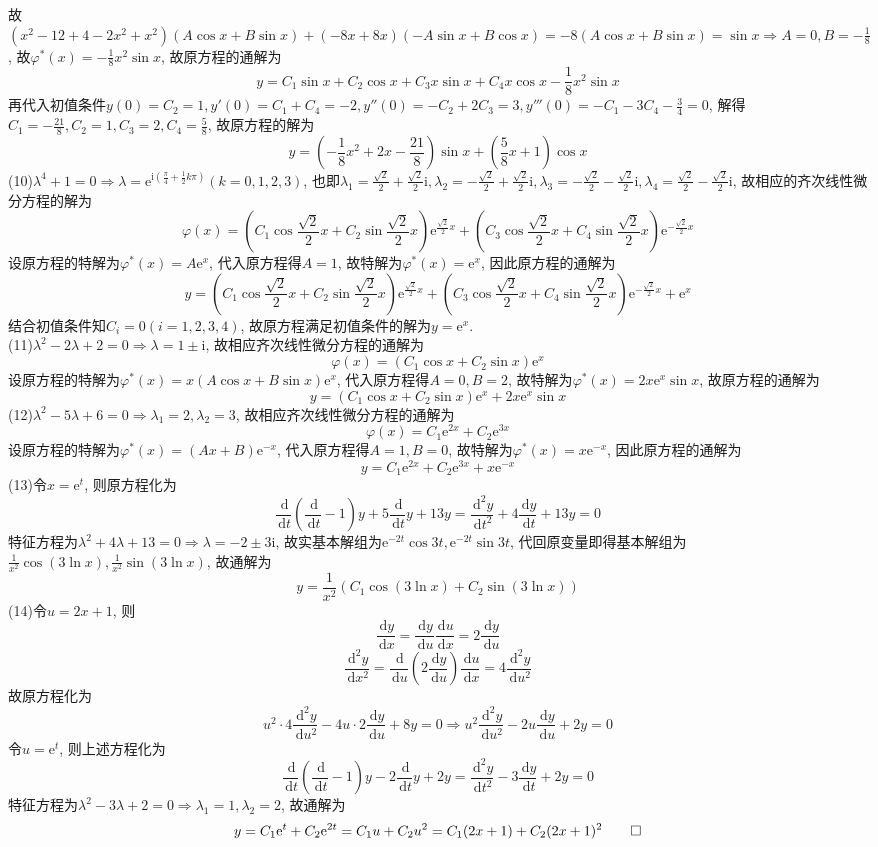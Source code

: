 \documentclass[titlepage,11pt,a4paper,twoside]{report}
\makeatletter
\newcommand\diff{\,\mathrm{d}}
\newcommand\e{\mathrm{e}}
\newcommand\ii{\mathrm{i}}
\newenvironment{solve}{\par
	\pushQED{\qed}%
	\normalfont \topsep1\p@\@plus6\p@\relax
	\trivlist
	\item\relax
	{\hspace*{\parindent}{\heiti 解}\@addpunct{:}}\hspace\labelsep\ignorespaces
}{%
	\popQED\endtrivlist\@endpefalse
}
\makeatother
\begin{document}
\begin{solve}
故$(x^2-12+4-2x^2+x^2)(A\cos x+B\sin x)+(-8x+8x)(-A\sin x+B\cos x)=-8(A\cos x+B\sin x)=\sin x\Rightarrow A=0,B=-\frac{1}{8}$, 故$\varphi^*(x)=-\frac{1}{8}x^2\sin x$, 故原方程的通解为
\[y=C_1\sin x+C_2\cos x+C_3x\sin x+C_4x\cos x-\frac{1}{8}x^2\sin x\]
再代入初值条件$y(0)=C_2=1,y'(0)=C_1+C_4=-2,y''(0)=-C_2+2C_3=3,y'''(0)=-C_1-3C_4-\frac{3}{4}=0$, 解得$C_1=-\frac{21}{8},C_2=1,C_3=2,C_4=\frac{5}{8}$, 故原方程的解为
\[y=\left(-\frac{1}{8}x^2+2x-\frac{21}{8}\right)\sin x+\left(\frac{5}{8}x+1\right)\cos x\]
(10)$\lambda^4+1=0\Rightarrow\lambda=\e^{\ii\left(\frac{\pi}{4}+\frac{1}{2}k\pi\right)}(k=0,1,2,3)$, 也即$\lambda_1=\frac{\sqrt{2}}{2}+\frac{\sqrt{2}}{2}\ii,\lambda_2=-\frac{\sqrt{2}}{2}+\frac{\sqrt{2}}{2}\ii,\lambda_3=-\frac{\sqrt{2}}{2}-\frac{\sqrt{2}}{2}\ii,\lambda_4=\frac{\sqrt{2}}{2}-\frac{\sqrt{2}}{2}\ii$, 故相应的齐次线性微分方程的解为
\[\varphi(x)=\left(C_1\cos\frac{\sqrt{2}}{2}x+C_2\sin\frac{\sqrt{2}}{2}x\right)\e^{\frac{\sqrt{2}}{2}x}+\left(C_3\cos\frac{\sqrt{2}}{2}x+C_4\sin\frac{\sqrt{2}}{2}x\right)\e^{-\frac{\sqrt{2}}{2}x}\]
设原方程的特解为$\varphi^*(x)=A\e^x$, 代入原方程得$A=1$, 故特解为$\varphi^*(x)=\e^x$, 因此原方程的通解为
\[y=\left(C_1\cos\frac{\sqrt{2}}{2}x+C_2\sin\frac{\sqrt{2}}{2}x\right)\e^{\frac{\sqrt{2}}{2}x}+\left(C_3\cos\frac{\sqrt{2}}{2}x+C_4\sin\frac{\sqrt{2}}{2}x\right)\e^{-\frac{\sqrt{2}}{2}x}+\e^x\]
结合初值条件知$C_i=0(i=1,2,3,4)$, 故原方程满足初值条件的解为$y=\e^x$.\\
(11)$\lambda^2-2\lambda+2=0\Rightarrow\lambda=1\pm\ii$, 故相应齐次线性微分方程的通解为
\[\varphi(x)=(C_1\cos x+C_2\sin x)\e^x\]
设原方程的特解为$\varphi^*(x)=x(A\cos x+B\sin x)\e^x$, 代入原方程得$A=0,B=2$, 故特解为$\varphi^*(x)=2x\e^x\sin x$, 故原方程的通解为
\[y=(C_1\cos x+C_2\sin x)\e^x+2x\e^x\sin x\]
(12)$\lambda^2-5\lambda+6=0\Rightarrow\lambda_1=2,\lambda_2=3$, 故相应齐次线性微分方程的通解为
\[\varphi(x)=C_1\e^{2x}+C_2\e^{3x}\]
设原方程的特解为$\varphi^*(x)=(Ax+B)\e^{-x}$, 代入原方程得$A=1,B=0$, 故特解为$\varphi^*(x)=x\e^{-x}$, 因此原方程的通解为\[y=C_1\e^{2x}+C_2\e^{3x}+x\e^{-x}\]
(13)令$x=\e^t$, 则原方程化为
\[\frac{\diff}{\diff t}\left(\frac{\diff}{\diff t}-1\right)y+5\frac{\diff}{\diff t}y+13y=\frac{\diff^2y}{\diff t^2}+4\frac{\diff y}{\diff t}+13y=0\]
特征方程为$\lambda^2+4\lambda+13=0\Rightarrow\lambda=-2\pm3\ii$, 故实基本解组为$\e^{-2t}\cos3t,\e^{-2t}\sin3t$, 代回原变量即得基本解组为$\frac{1}{x^2}\cos(3\ln x),\frac{1}{x^2}\sin(3\ln x)$, 故通解为
\[y=\frac{1}{x^2}(C_1\cos(3\ln x)+C_2\sin(3\ln x))\]
(14)令$u=2x+1$, 则
\[\frac{\diff y}{\diff x}=\frac{\diff y}{\diff u}\frac{\diff u}{\diff x}=2\frac{\diff y}{\diff u}\]
\[\frac{\diff^2y}{\diff x^2}=\frac{\diff}{\diff u}\left(2\frac{\diff y}{\diff u}\right)\frac{\diff u}{\diff x}=4\frac{\diff^2y}{\diff u^2}\]
故原方程化为\[u^2\cdot4\frac{\diff^2y}{\diff u^2}-4u\cdot2\frac{\diff y}{\diff u}+8y=0\Rightarrow u^2\frac{\diff^2y}{\diff u^2}-2u\frac{\diff y}{\diff u}+2y=0\]
令$u=\e^t$, 则上述方程化为
\[\frac{\diff}{\diff t}\left(\frac{\diff}{\diff t}-1\right)y-2\frac{\diff}{\diff t}y+2y=\frac{\diff^2y}{\diff t^2}-3\frac{\diff y}{\diff t}+2y=0\]
特征方程为$\lambda^2-3\lambda+2=0\Rightarrow\lambda_1=1,\lambda_2=2$, 故通解为
\[y=C_1\e^t+C_2\e^{2t}=C_1u+C_2u^2=C_1(2x+1)+C_2(2x+1)^2\qedhere\]
\end{solve}
\end{document}
